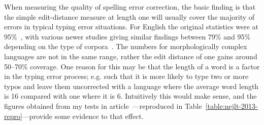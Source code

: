 \documentclass[officiallayout]{unihelcompling}
\begin{document}
When measuring the quality of spelling error correction, the basic finding is
that the simple edit-distance measure at length one will usually cover the
majority of errors in typical typing error situations. For English the original
statistics were at 95\%~\citep{damerau1964technique}, with various newer
studies giving similar findings between 79\% and 95\% depending on the type
of corpora~\citep{kukich1992spelling}.  The numbers for morphologically complex
languages are not in the same range, rather the edit distance of one gains around
50--70\% coverage. One reason for this may be that the length of a word is a
factor in the typing error process; e.g. such that it is more likely to type
two or more typos and leave them uncorrected with a language where the average
word length is 16 compared with one where it is 6. Intuitively this would make
sense, and the figures obtained from my tests in article~---reproduced in Table~\ref{table:nejlt-2013-repro}---provide some
evidence to that effect.
\end{document}
